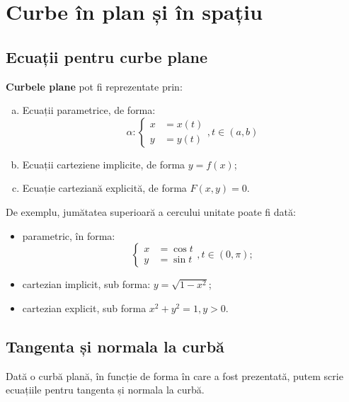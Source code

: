 
\chapter{Curbe în plan și în spațiu}


\section{Ecuații pentru curbe plane}

\textbf{Curbele plane} pot fi reprezentate prin:
\begin{enumerate}[(a)]
  \item Ecuații parametrice, de forma:
    \[
      \alpha : \begin{cases}
        x &= x(t) \\
        y &= y(t)
      \end{cases}, t \in (a, b)
    \]
  \item Ecuații carteziene implicite, de forma $ y = f(x) $;
  \item Ecuație carteziană explicită, de forma $ F(x, y) = 0 $.
\end{enumerate}

De exemplu, jumătatea superioară a cercului unitate poate fi dată:
\begin{itemize}
  \item parametric, în forma:
    \[
      \begin{cases}
        x &= \cos t \\
        y &= \sin t
      \end{cases}, t \in (0, \pi);
    \]
  \item cartezian implicit, sub forma: $ y = \sqrt{1 - x^2} $;
  \item cartezian explicit, sub forma $ x^2 + y^2 = 1, y > 0 $.
\end{itemize}

\section{Tangenta și normala la curbă}

Dată o curbă plană, în funcție de forma în care a fost prezentată,
putem scrie ecuațiile pentru tangenta și normala la curbă.

